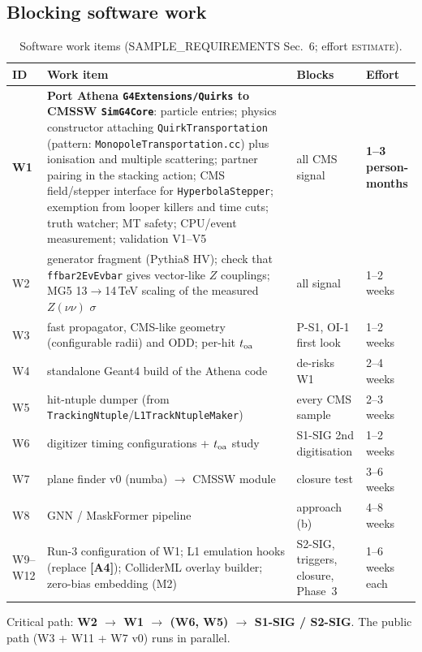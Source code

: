 \documentclass[11pt,a4paper]{article}
\newcommand{\EST}{\textsc{estimate}}
\newcommand{\lab}[1]{\textbf{[#1]}}
\begin{document}
\subsection{Blocking software work}
{\small
\begin{longtable}{@{}L{0.82cm}L{9.44cm}L{3.08cm}L{2.77cm}@{}}
\caption{Software work items (SAMPLE\_REQUIREMENTS Sec.~6; effort \EST).}\label{tab:work}\\
\toprule ID & Work item & Blocks & Effort\\\midrule\endfirsthead
\bottomrule\endfoot
\textbf{W1} & \textbf{Port Athena \texttt{G4Extensions/Quirks} to CMSSW \texttt{SimG4Core}}: particle entries; physics constructor attaching \texttt{QuirkTransportation} (pattern: \texttt{MonopoleTransportation.cc}) plus ionisation and multiple scattering; partner pairing in the stacking action; CMS field/stepper interface for \texttt{HyperbolaStepper}; exemption from looper killers and time cuts; truth watcher; MT safety; CPU/event measurement; validation V1--V5 & all CMS signal & \textbf{1--3 person-months}\\
W2 & generator fragment (Pythia8 HV); check that \texttt{ffbar2EvEvbar} gives vector-like $Z$ couplings; MG5 13$\to$14\,TeV scaling of the measured $Z(\nu\nu)$ $\sigma$ & all signal & 1--2 weeks\\
W3 & fast propagator, CMS-like geometry (configurable radii) and ODD; per-hit $t_{\rm oa}$ & P-S1, OI-1 first look & 1--2 weeks\\
W4 & standalone Geant4 build of the Athena code & de-risks W1 & 2--4 weeks\\
W5 & hit-ntuple dumper (from \texttt{TrackingNtuple}/\texttt{L1TrackNtupleMaker}) & every CMS sample & 2--3 weeks\\
W6 & digitizer timing configurations + $t_{\rm oa}$ study & S1-SIG 2nd digitisation & 1--2 weeks\\
W7 & plane finder v0 (numba) $\to$ CMSSW module & closure test & 3--6 weeks\\
W8 & GNN / MaskFormer pipeline & approach (b) & 4--8 weeks\\
W9--W12 & Run-3 configuration of W1; L1 emulation hooks (replace \lab{A4}); ColliderML overlay builder; zero-bias embedding (M2) & S2-SIG, triggers, closure, Phase~3 & 1--6 weeks each\\
\end{longtable}
}
Critical path: \textbf{W2 $\to$ W1 $\to$ (W6, W5) $\to$ S1-SIG / S2-SIG}. The public path (W3 + W11 + W7 v0) runs in parallel.
\end{document}
